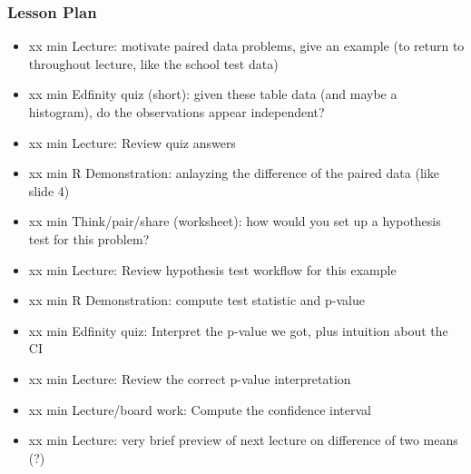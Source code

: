 \begin{frame}
    \frametitle{Lesson Plan}
    \begin{itemize}
        \item xx min Lecture: motivate paired data problems, give an example (to return to throughout lecture, like the school test data)   
        \item xx min Edfinity quiz (short): given these table data (and maybe a histogram), do the observations appear independent?
        \item xx min Lecture: Review quiz answers
        \item xx min R Demonstration: anlayzing the difference of the paired data (like slide 4)
        \item xx min Think/pair/share (worksheet): how would you set up a hypothesis test for this problem?
        \item xx min Lecture: Review hypothesis test workflow for this example
        \item xx min R Demonstration: compute test statistic and p-value 
        \item xx min Edfinity quiz: Interpret the p-value we got, plus intuition about the CI
        \item xx min Lecture: Review the correct p-value interpretation
        \item xx min Lecture/board work: Compute the confidence interval
        \item xx min Lecture: very brief preview of next lecture on difference of two means (?)
    \end{itemize}

\end{frame}
            

